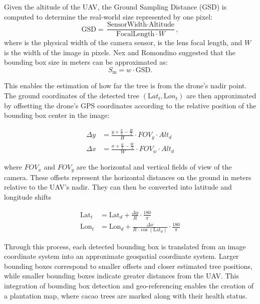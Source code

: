 Given the altitude of the UAV, the Ground Sampling Distance (GSD) is computed to determine the real-world size represented by one pixel:
\begin{equation}
	\text{GSD} = \frac{\text{SensorWidth} \cdot \text{Altitude}}{\text{FocalLength} \cdot W},
\end{equation}
where  is the physical width of the camera sensor,  is the lens focal length, and $W$ is the width of the image in pixels. Nex and Romondino suggested that the bounding box size in meters can be approximated as:
\begin{equation}
	S_\text{m} = w \cdot \text{GSD}.
\end{equation}

This enables the estimation of how far the tree is from the drone’s nadir point. The ground coordinates of the detected tree $(\text{L}at_t, \text{L}on_t)$ are then approximated by offsetting the drone’s GPS coordinates according to the relative position of the bounding box center in the image:

\begin{align}
	\Delta y & = \frac{y + \frac{h}{2} - \frac{H}{2}}{H} \cdot FOV_y \cdot Alt_d \\
	\Delta x & = \frac{x + \frac{w}{2} - \frac{W}{2}}{W} \cdot FOV_w \cdot Alt_d
\end{align}

where $FOV_x$ and $FOV_y$ are the horizontal and vertical fields of view of the camera. These offsets represent the horizontal distances on the ground in meters relative to the UAV’s nadir. They can then be converted into latitude and longitude shifts


\begin{align}
	\text{Lat}_t & = \text{Lat}_d + \frac{\Delta y}{R} \cdot \frac{180}{\pi}                          \\
	\text{Lon}_t & = \text{Lon}_d + \frac{\Delta x}{R \cdot \cos(\text{Lat}_d)} \cdot \frac{180}{\pi}
\end{align}

Through this process, each detected bounding box is translated from an image coordinate system into an approximate geospatial coordinate system. Larger bounding boxes correspond to smaller offsets and closer estimated tree positions, while smaller bounding boxes indicate greater distances from the UAV. This integration of bounding box detection and geo-referencing enables the creation of a plantation map, where cacao trees are marked along with their health status.


